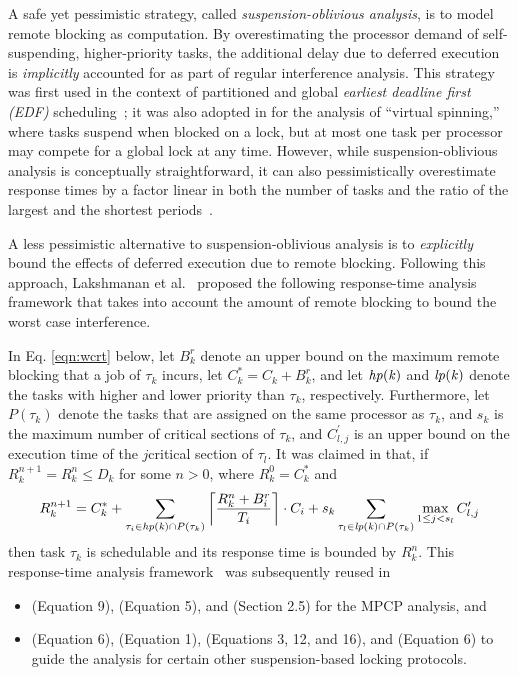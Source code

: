 A safe yet pessimistic strategy, called \emph{suspension-oblivious analysis}, is to model remote blocking as computation. By overestimating the processor demand of self-suspending, higher-priority tasks, the additional delay due to deferred execution is \emph{implicitly} accounted for as part of regular interference analysis. This strategy was first used in the context of partitioned and global \emph{earliest deadline first (EDF)} scheduling~\cite{block-2007}; it was also adopted in \cite{lakshmanan-2009} for the analysis of ``virtual spinning,'' where tasks suspend when blocked on a lock, but at most one task per processor may compete for a global lock at any time. However, while suspension-oblivious analysis is conceptually straightforward, it can also pessimistically overestimate response times by a factor linear in both the number of tasks and the ratio of the largest and the shortest periods~\cite{wieder-2013}.

A less pessimistic alternative to suspension-oblivious analysis is to \emph{explicitly} bound the effects of deferred execution due to remote blocking. Following this approach, Lakshmanan et al.~\cite{lakshmanan-2009} proposed the following response-time analysis framework that takes into account the amount of remote blocking to bound the worst case interference.

In Eq. \eqref{eqn:wcrt} below, let $B_k^r$ denote an upper bound on the maximum remote blocking that a job of $\tau_k$ incurs, let $C_k^{\ast} = C_k + B_k^r$, and let $\mathit{hp(k)}$ and $\mathit{lp(k)}$ denote the tasks with higher and lower priority than $\tau_k$, respectively. Furthermore, let $P(\tau_k)$ denote the tasks that are assigned on the same processor as $\tau_k$, and $s_k$ is the maximum number of critical sections of $\tau_k$, and $C_{l,j}^{\prime}$ is an upper bound on the execution time of the $j$\xth critical section of $\tau_l$. It was claimed in \cite{lakshmanan-2009} that, if $R_k^{n+1} = R_k^n \leq D_k$ for some $n > 0$, where $R_k^0 = C_k^{\ast}$ and
\begin{equation}
\label{eqn:wcrt}
R_k^{n+1} = C_k^{\ast} + \sum_{\tau_i \in \mathit{hp(k)} \cap P(\tau_k)} \left \lceil \frac{R_k^n + B_i^r}{T_i} \right \rceil \cdot C_i + s_k \sum_{\tau_l \in \mathit{lp(k)} \cap P(\tau_k)} \max_{1 \leq j < s_l} C_{l,j}^{\prime}
\end{equation}
then task $\tau_k$ is schedulable and its response time is bounded by $R_k^n$. This  response-time analysis framework~\cite{lakshmanan-2009} was subsequently reused in
\begin{itemize}
\item \cite{zeng-2011} (Equation 9), \cite{han-2014}(Equation 5), and \cite{yang-2014} (Section 2.5) for the MPCP analysis, and
\item \cite{yang-2013} (Equation 6), \cite{bbb-2013} (Equation 1), \cite{carminati-2014} (Equations 3, 12, and 16), and \cite{kim-2014} (Equation 6) to guide the analysis for certain other suspension-based locking protocols.
\end{itemize}

